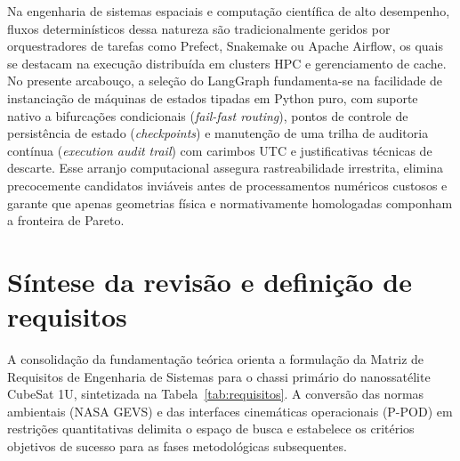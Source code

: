 Na engenharia de sistemas espaciais e computação científica de alto desempenho, fluxos determinísticos dessa natureza são tradicionalmente geridos por orquestradores de tarefas como Prefect, Snakemake ou Apache Airflow, os quais se destacam na execução distribuída em clusters HPC e gerenciamento de cache. No presente arcabouço, a seleção do LangGraph fundamenta-se na facilidade de instanciação de máquinas de estados tipadas em Python puro, com suporte nativo a bifurcações condicionais (\textit{fail-fast routing}), pontos de controle de persistência de estado (\textit{checkpoints}) e manutenção de uma trilha de auditoria contínua (\textit{execution audit trail}) com carimbos UTC e justificativas técnicas de descarte. Esse arranjo computacional assegura rastreabilidade irrestrita, elimina precocemente candidatos inviáveis antes de processamentos numéricos custosos e garante que apenas geometrias física e normativamente homologadas componham a fronteira de Pareto.

\section{Síntese da revisão e definição de requisitos}
\label{sec:requisitos}

A consolidação da fundamentação teórica orienta a formulação da Matriz de Requisitos de Engenharia de Sistemas para o chassi primário do nanossatélite CubeSat 1U, sintetizada na Tabela~\ref{tab:requisitos}. A conversão das normas ambientais (NASA GEVS) e das interfaces cinemáticas operacionais (P-POD) em restrições quantitativas delimita o espaço de busca e estabelece os critérios objetivos de sucesso para as fases metodológicas subsequentes.

